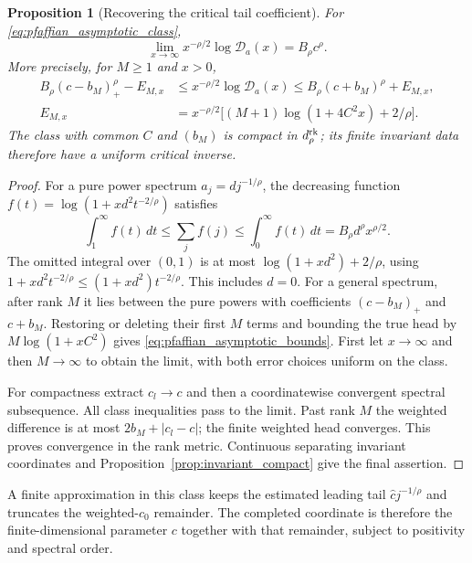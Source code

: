 \documentclass[11pt,a4paper]{amsart}
\numberwithin{equation}{section}
\newtheorem{proposition}[theorem]{Proposition}
\theoremstyle{definition}
\theoremstyle{remark}
\begin{document}
\begin{proposition}[Recovering the critical tail coefficient]\label{prop:pfaffian_asymptotic}
For \eqref{eq:pfaffian_asymptotic_class},
\begin{equation}\label{eq:pfaffian_asymptotic_limit}
 \lim_{x\to\infty}x^{-\rho/2}\log\mathscr D_a(x)=B_\rho c^\rho.
\end{equation}
More precisely, for $M\ge1$ and $x>0$,
\begin{align}
 B_\rho(c-b_M)_+^\rho-E_{M,x}
 &\le x^{-\rho/2}\log\mathscr D_a(x)
 \le B_\rho(c+b_M)^\rho+E_{M,x},\label{eq:pfaffian_asymptotic_bounds}\\
 E_{M,x}&=x^{-\rho/2}\big[(M+1)\log(1+4C^2x)+2/\rho\big].
 \label{eq:pfaffian_asymptotic_error}
\end{align}
The class with common $C$ and $(b_M)$ is compact in $d_\rho^{\rm rk}$; its finite invariant data therefore have a uniform critical inverse.
\end{proposition}
\begin{proof}
For a pure power spectrum $a_j=dj^{-1/\rho}$, the decreasing function
$f(t)=\log(1+xd^2t^{-2/\rho})$ satisfies
\[
 \int_1^\infty f(t)\,dt\le\sum_jf(j)\le\int_0^\infty f(t)\,dt
 =B_\rho d^\rho x^{\rho/2}.
\]
The omitted integral over $(0,1)$ is at most $\log(1+xd^2)+2/\rho$, using
$1+xd^2t^{-2/\rho}\le(1+xd^2)t^{-2/\rho}$. This includes $d=0$.
For a general spectrum, after rank $M$ it lies between the pure powers with coefficients $(c-b_M)_+$ and $c+b_M$. Restoring or deleting their first $M$ terms and bounding the true head by $M\log(1+xC^2)$ gives \eqref{eq:pfaffian_asymptotic_bounds}. First let $x\to\infty$ and then $M\to\infty$ to obtain the limit, with both error choices uniform on the class.

For compactness extract $c_l\to c$ and then a coordinatewise convergent spectral subsequence. All class inequalities pass to the limit. Past rank $M$ the weighted difference is at most $2b_M+|c_l-c|$; the finite weighted head converges. This proves convergence in the rank metric. Continuous separating invariant coordinates and Proposition~\ref{prop:invariant_compact} give the final assertion.
\end{proof}

A finite approximation in this class keeps the estimated leading tail $\widehat c j^{-1/\rho}$ and truncates the weighted-$c_0$ remainder. The completed coordinate is therefore the finite-dimensional parameter $c$ together with that remainder, subject to positivity and spectral order.
\end{document}
